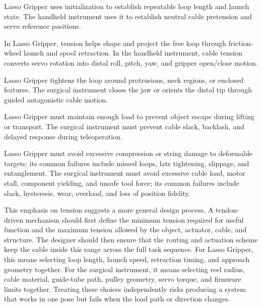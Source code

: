 \begin{description}[style=nextline,leftmargin=1.5em,labelindent=0pt,itemsep=0.8em]
    \item[\textbf{Initialization.}]
    Lasso Gripper uses initialization to establish repeatable loop length and launch state. The handheld instrument uses it to establish neutral cable pretension and servo reference positions.

    \item[\textbf{Motion generation.}]
    In Lasso Gripper, tension helps shape and project the free loop through friction-wheel launch and spool retraction. In the handheld instrument, cable tension converts servo rotation into distal roll, pitch, yaw, and gripper open/close motion.

    \item[\textbf{Contact formation.}]
    Lasso Gripper tightens the loop around protrusions, neck regions, or enclosed features. The surgical instrument closes the jaw or orients the distal tip through guided antagonistic cable motion.

    \item[\textbf{Stability.}]
    Lasso Gripper must maintain enough load to prevent object escape during lifting or transport. The surgical instrument must prevent cable slack, backlash, and delayed response during teleoperation.

    \item[\textbf{Safety and failure modes.}]
    Lasso Gripper must avoid excessive compression or string damage to deformable targets; its common failures include missed loops, late tightening, slippage, and entanglement. The surgical instrument must avoid excessive cable load, motor stall, component yielding, and unsafe tool force; its common failures include slack, hysteresis, wear, overload, and loss of position fidelity.
\end{description}

This emphasis on tension suggests a more general design process. A tendon-driven mechanism should first define the minimum tension required for useful function and the maximum tension allowed by the object, actuator, cable, and structure. The designer should then ensure that the routing and actuation scheme keep the cable inside this range across the full task sequence. For Lasso Gripper, this means selecting loop length, launch speed, retraction timing, and approach geometry together. For the surgical instrument, it means selecting reel radius, cable material, guide-tube path, pulley geometry, servo torque, and firmware limits together. Treating these choices independently risks producing a system that works in one pose but fails when the load path or direction changes.


